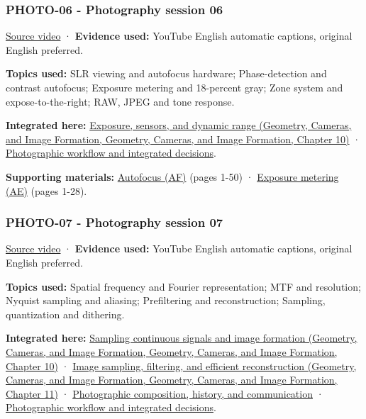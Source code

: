 \subsubsection{PHOTO-06 - Photography session 06}\label{04-visual-computing-ii-ch036-photo-06---photography-session-06}

\href{https://www.youtube.com/watch?v=njlDb9-6aOU}{Source video} · \textbf{Evidence used:} YouTube English automatic captions, original English preferred.

\textbf{Topics used:} SLR viewing and autofocus hardware; Phase-detection and contrast autofocus; Exposure metering and 18-percent gray; Zone system and expose-to-the-right; RAW, JPEG and tone response.

\textbf{Integrated here:} \href{../03-Geometry-Cameras-and-Image-Formation/main.pdf\#nameddest=03-visual-computing-i-ch003-exposure-sensors-and-dynamic-range}{Exposure, sensors, and dynamic range (Geometry, Cameras, and Image Formation, Geometry, Cameras, and Image Formation, Chapter 10)} · \hyperref[04-visual-computing-ii-ch034-photographic-workflow-and-integrated-decisions]{Photographic workflow and integrated decisions}.

\textbf{Supporting materials:} \href{https://drive.google.com/open?id=0B6w2XfPHEcZYQnR3SG43Z2VIRmM}{Autofocus (AF)} (pages 1-50) · \href{https://drive.google.com/open?id=0B6w2XfPHEcZYbG9EWlhacm80SFE}{Exposure metering (AE)} (pages 1-28).

\subsubsection{PHOTO-07 - Photography session 07}\label{04-visual-computing-ii-ch036-photo-07---photography-session-07}

\href{https://www.youtube.com/watch?v=02tgqvQzp0Y}{Source video} · \textbf{Evidence used:} YouTube English automatic captions, original English preferred.

\textbf{Topics used:} Spatial frequency and Fourier representation; MTF and resolution; Nyquist sampling and aliasing; Prefiltering and reconstruction; Sampling, quantization and dithering.

\textbf{Integrated here:} \href{../03-Geometry-Cameras-and-Image-Formation/main.pdf\#nameddest=03-visual-computing-i-ch003-sampling-continuous-signals-and-image-formation}{Sampling continuous signals and image formation (Geometry, Cameras, and Image Formation, Geometry, Cameras, and Image Formation, Chapter 10)} · \href{../03-Geometry-Cameras-and-Image-Formation/main.pdf\#nameddest=03-visual-computing-i-ch004-image-sampling-filtering-and-efficient-reconstruction}{Image sampling, filtering, and efficient reconstruction (Geometry, Cameras, and Image Formation, Geometry, Cameras, and Image Formation, Chapter 11)} · \hyperref[04-visual-computing-ii-ch034-photographic-composition-history-and-communication]{Photographic composition, history, and communication} · \hyperref[04-visual-computing-ii-ch034-photographic-workflow-and-integrated-decisions]{Photographic workflow and integrated decisions}.

